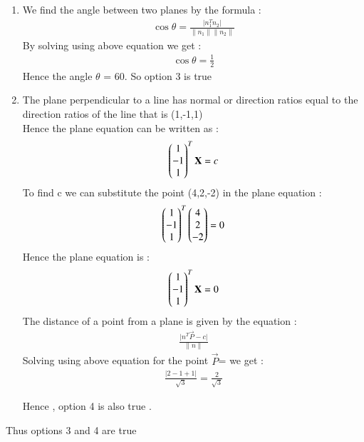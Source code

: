 \documentclass[journal]{IEEEtran}
\begin{document}
\begin{enumerate}
\item 
We find the angle between two planes by the formula :
\begin{align}
    \cos\theta = \frac{\lvert n_1^{T}n_2 \rvert}{\lVert n_1\rVert\lVert n_2\rVert}
\end{align}
By solving using above equation we get :
\begin{align}
    \cos\theta = \frac{1}{2}
\end{align}
Hence the angle $\theta$ = 60\degree . So option 3 is true 

\item 
The plane perpendicular to a line has normal or direction ratios equal to the direction ratios of the line that is (1,-1,1)\\
Hence the plane equation can be written as :
\begin{align}
    \begin{pmatrix}1\\-1\\1\end{pmatrix}^T\mathbf{X} = c
\end{align}
To find c we can substitute the point (4,2,-2) in the plane equation :
\begin{align}
    \begin{pmatrix}1\\-1\\1\end{pmatrix}^T\begin{pmatrix}4\\2\\-2\end{pmatrix} = 0
\end{align}
Hence the plane equation is :
\begin{align}
    \begin{pmatrix}1\\-1\\1\end{pmatrix}^T\mathbf{X} = 0
\end{align}
The distance of a point from a plane is given by the equation :
\begin{align}
    \frac{\lvert n^{T}\vec{P} - c \rvert}{\lVert n \rVert}
\end{align}
Solving using above equation for the point $\vec{P} $=  we get :
 \begin{align}
      \frac{\lvert 2 - 1 +1 \rvert}{\sqrt{3}} = \frac{2}{\sqrt{3}}
 \end{align}

 Hence , option 4 is also true .\\
 \end{enumerate}
 Thus options 3 and 4 are true 
\end{document}
